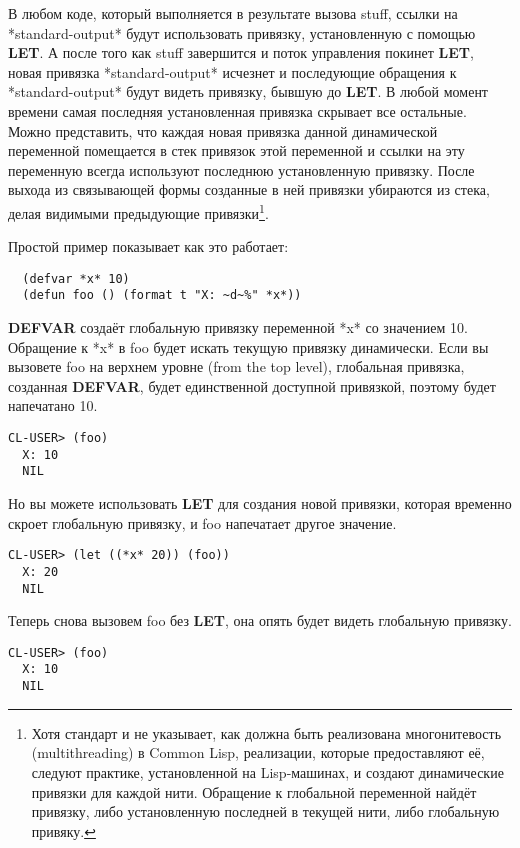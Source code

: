 В любом коде, который выполняется в результате вызова stuff, ссылки на *standard-output*
будут использовать привязку, установленную с помощью \textbf{LET}. А после того как stuff
завершится и поток управления покинет \textbf{LET}, новая привязка *standard-output*
исчезнет и последующие обращения к *standard-output* будут видеть привязку, бывшую до
\textbf{LET}. В любой момент времени самая последняя установленная привязка скрывает все
остальные. Можно представить, что каждая новая привязка данной динамической переменной
помещается в стек привязок этой переменной и ссылки на эту переменную всегда используют
последнюю установленную привязку. После выхода из связывающей формы созданные в ней
привязки убираются из стека, делая видимыми предыдующие привязки\footnote{Хотя стандарт и
  не указывает, как должна быть реализована многонитевость (multithreading) в Common Lisp,
  реализации, которые предоставляют её, следуют практике, установленной на Lisp-машинах, и
  создают динамические привязки для каждой нити. Обращение к глобальной переменной найдёт
  привязку, либо установленную последней в текущей нити, либо глобальную привяку.}.

Простой пример показывает как это работает:

\begin{lstlisting}
  (defvar *x* 10)
  (defun foo () (format t "X: ~d~%" *x*))
\end{lstlisting}

\textbf{DEFVAR} создаёт глобальную привязку переменной *x* со значением 10. Обращение к
*x* в foo будет искать текущую привязку динамически. Если вы вызовете foo на верхнем
уровне (from the top level), глобальная привязка, созданная \textbf{DEFVAR}, будет
единственной доступной привязкой, поэтому будет напечатано 10.

\begin{lstlisting}[style=lisprepl]
  CL-USER> (foo)
  X: 10
  NIL
\end{lstlisting}

Но вы можете использовать \textbf{LET} для создания новой привязки, которая временно
скроет глобальную привязку, и foo напечатает другое значение.

\begin{lstlisting}[style=lisprepl]
  CL-USER> (let ((*x* 20)) (foo))
  X: 20
  NIL
\end{lstlisting}

Теперь снова вызовем foo без \textbf{LET}, она опять будет видеть глобальную привязку.

\begin{lstlisting}[style=lisprepl]
  CL-USER> (foo)
  X: 10
  NIL
\end{lstlisting}

